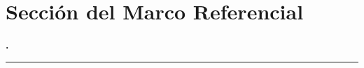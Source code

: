 \section{Sección del Marco Referencial} %
\label{sec:marco_referencial} %
\begin{frame}
    \centering
    \vspace{1cm}
    {\LARGE\bfseries \insertsectionnumber. \insertsection}

    \rule{0.5\linewidth}{1pt}
\end{frame}


